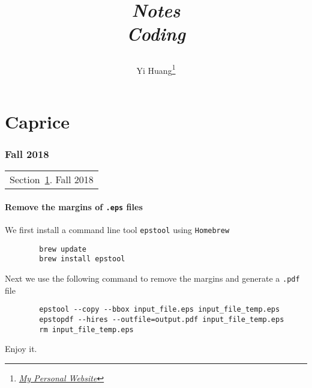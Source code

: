 \documentclass[10pt]{article}
\title{\begin{center}{\Huge \textit{Notes}}\\{{\itshape Coding}}\end{center}}
\author{Yi Huang\footnote{\href{https://yiihuang.com/}{\textit{My Personal Website}}}}
\affiliation{
University of Minnesota
}
\begin{document}
	\maketitle
	\flushbottom
	\newpage
	\pagestyle{fancynotes}
	\part{Caprice}
	\section{Fall 2018}\label{sec:fall2018}
	\begin{margintable}\vspace{.8in}\footnotesize
		\begin{tabularx}{\marginparwidth}{|X}
		Section~\ref{sec:fall2018}. Fall 2018\\
		\end{tabularx}
	\end{margintable}

	\subsection{Remove the margins of \texttt{.eps} files}

	We first install a command line tool \texttt{epstool} using \texttt{Homebrew}
	\begin{verbatim}
		brew update
		brew install epstool
	\end{verbatim}
	Next we use the following command to remove the margins and generate a \texttt{.pdf} file
	\begin{verbatim}
		epstool --copy --bbox input_file.eps input_file_temp.eps
		epstopdf --hires --outfile=output.pdf input_file_temp.eps
		rm input_file_temp.eps
	\end{verbatim}
	Enjoy it.
\end{document}
